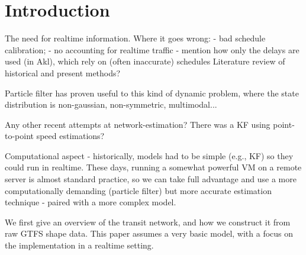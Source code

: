 \section{Introduction}
\label{sec:intro}


The need for realtime information.
Where it goes wrong: 
- bad schedule calibration;
- no accounting for realtime traffic 
- mention how only the delays are used (in Akl), which rely on (often inaccurate) schedules
Literature review of historical and present methods?





Particle filter has proven useful to this kind of dynamic problem,
where the state distribution is non-gaussian, non-symmetric, 
multimodal...

Any other recent attempts at network-estimation?
There was a KF using point-to-point speed estimations? 

Computational aspect - historically, models had to be simple 
(e.g., KF) so they could run in realtime.
These days, running a somewhat powerful VM on a remote server
is almost standard practice, so we can take full advantage 
and use a more computationally demanding (particle filter)
but more accurate estimation technique - paired with a more complex model.

We first give an overview of the transit network,
and how we construct it from raw GTFS shape data.
This paper assumes a very basic model,
with a focus on the implementation in a realtime setting.

